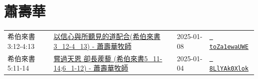 \documentclass{book}
\begin{document}
\chapter{蕭壽華}\label{ch:preacher7}
\begin{multicols}{3}
\minitoc
\end{multicols}
{ \scriptsize


\begin{xltabular}{\textwidth}{|p{0.15\textwidth} p{0.6\textwidth}|p{0.07\textwidth} p{0.1\textwidth}|}
\hline
希伯來書 3:12-4:13 & \hyperref[sec:toZa1ewaUWE]{以信心與所聽見的道配合(希伯來書3\_12-4\_13) - 蕭壽華牧師} & 2025-01-08 & \href{https://youtube.com/watch?v=toZa1ewaUWE}{\texttt{ toZa1ewaUWE}} \\
希伯來書 5:11-14 & \hyperref[sec:8LlYAk0Xlok]{嘗過天恩 卻長蒺藜 (希伯來書5\_11-14;6\_1-12) - 蕭壽華牧師} & 2025-01-04 & \href{https://youtube.com/watch?v=8LlYAk0Xlok}{\texttt{ 8LlYAk0Xlok}} \\
\hline
\end{xltabular}
}
\newpage
\end{document}
